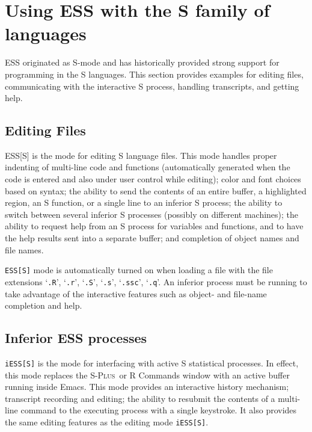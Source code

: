 \documentclass{article}
\newcommand*{\Splus}{\textsc{S-Plus}}
\newcommand{\stexttt}[1]{{\small\texttt{#1}}}
\newcommand{\file}[1]{`\stexttt{#1}'}
\begin{document}
\section{Using ESS with the S family of languages}
\label{sec:S}

ESS originated as S-mode and has historically provided strong support for
programming in the S languages.  This section provides examples for
editing files, communicating with the interactive S process, handling
transcripts, and getting help.

\subsection{Editing Files}
\label{sec:S:edit}

ESS[S] is the mode for editing S language files.  This mode handles
proper indenting of multi-line code and functions (automatically
generated when the code is entered and also under user control while editing);
color and font choices based on syntax; the
ability to send the contents of an entire buffer, a highlighted
region, an S function, or a single line to an inferior S process;
the ability to switch between several inferior S processes
(possibly on different machines); the ability to
request help from an S process for variables and functions, and to
have the help results sent into a separate buffer; and completion of object
names and file names.

\stexttt{ESS[S]} mode is automatically turned on when loading a file with the
file extensions \file{.R}, \file{.r},
\file{.S}, \file{.s}, \file{.ssc}, \file{.q}.  An inferior
process must be running to take advantage of the interactive features
such as object- and file-name completion and help.

\subsection{Inferior ESS processes}
\label{sec:S:inf}

\stexttt{iESS[S]} is the mode for interfacing with active S
statistical processes.  In effect, this mode replaces the \Splus\ or R
Commands window with an active buffer running inside Emacs.  This mode
provides an interactive history mechanism; transcript recording and
editing; the ability to resubmit the contents of a multi-line command
to the executing process with a single keystroke.  It also provides
the same editing features as the editing mode \stexttt{iESS[S]}.
\end{document}
